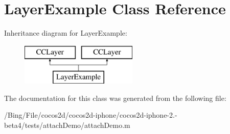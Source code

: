 \hypertarget{interface_layer_example}{\section{Layer\-Example Class Reference}
\label{interface_layer_example}
}
Inheritance diagram for Layer\-Example\-:\begin{figure}[H]
\begin{center}
\leavevmode
\includegraphics[height=2.000000cm]{interface_layer_example}
\end{center}
\end{figure}


The documentation for this class was generated from the following file\-:\begin{DoxyCompactItemize}
\item 
/\-Bing/\-File/cocos2d/cocos2d-\/iphone/cocos2d-\/iphone-\/2.-\/beta4/tests/attach\-Demo/attach\-Demo.\-m\end{DoxyCompactItemize}
